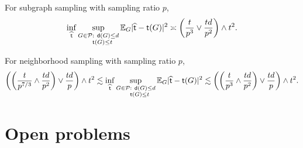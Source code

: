\begin{theorem} \label{thm:triangle-planar-subgraph}
For subgraph sampling with sampling ratio $ p $,
\begin{equation*}
\inf_{\widehat{{\mathsf{t}}}}\sup_{\substack{G \in {\mathcal{P}}: ~{\mathsf{d}}(G)\leq d\\ ~~~{\mathsf{t}}(G) \leq t}}\mathbb{E}_G|\widehat{{\mathsf{t}}}-{\mathsf{t}}(G)|^2 \asymp \left(\frac{t}{p^3} \vee \frac{td}{p^2} \right) \wedge t^2.
\end{equation*}
\end{theorem}

\begin{theorem} \label{thm:triangle-planar}
For neighborhood sampling with sampling ratio $ p $,
\begin{equation*}
\left(\left( \frac{t}{p^{7/3}} \wedge \frac{td}{p^2} \right)\vee \frac{td}{p} \right) \wedge t^2 \lesssim \inf_{\widehat{{\mathsf{t}}}}\sup_{\substack{G \in {\mathcal{P}}: ~{\mathsf{d}}(G)\leq d\\ ~~~{\mathsf{t}}(G) \leq t}}\mathbb{E}_G|\widehat{{\mathsf{t}}}-{\mathsf{t}}(G)|^2 \lesssim \left(\left(\frac{t}{p^3} \wedge \frac{td}{p^2} \right)\vee \frac{td}{p} \right) \wedge t^2.
\end{equation*}
\end{theorem}

\section{Open problems}
\label{app:open}

